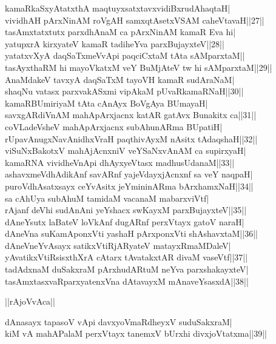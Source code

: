 \documentclass{article}
\begin{document}
kamaRkaSxyAtatxthA maqtuyxsatxtavxvidiBxrudAhaqtaH|\\
vividhAH pArxNinAM roVgAH samxqtAsetxVSAM caheVtavaH||27||\\
tasAmxtatxtutx parxdhAnaM ca pArxNinAM kamaR Eva hi|\\
yatupxrA kirxyateV kamaR tadiheYva parxBujayxteV||28||\\
yatatxvXyA daqSaTxmeVvApi paqciCxtaM tAta sAMparxtaM||\\
tasAyxthaRM hi mayoVkatxM veY BuMjAteV tw hi sAMparxtaM||29||\\
AnaMdakeV tavxyA daqSaTxM tayoVH kamaR sudAraNaM|\\
shaqNu vatasx parxvakASxmi vipAkaM pUvaRkamaRNaH||30||\\
kamaRBUmiriyaM tAta cAnAyx BoVgAya BUmayaH|\\
savxgARdiVnAM mahApArxjacnx katAR gatAvx Bunakitx ca||31||\\
coVLadeVsheV mahApArxjacnx subAhunARma BUpatiH|\\
rUpavAnugxNavAnidhxVraH paqthivAyxM nAsitx tAdaqshaH||32||\\
viSuNxBakotxV mahAjAcnxniV veYSaNxvAnAM ca supirxyaH|\\
kamaRNA vividheVnApi dhAyxyeVtasx madhusUdanaM||33||\\
ashavxmeVdhAdikAnf savARnf yajeVdayxjAcnxnf sa veY naqpaH|\\
puroVdhAsatxsayx ceYvAsitx jeYmininARma bArxhamxNaH||34||\\
sa cAhUya subAhuM tamidaM vacanaM mabarxviVtf|\\
rAjanf deVhi sudAnAni yeYshacx swKayxM parxBujayxteV||35||\\
dAneYsutx laBateV loVkAnf dugARnf perxVtayx gatoV naraH|\\
dAneVna suKamAponxVti yashaH pArxponxVti shAshavxtaM||36||\\
dAneVneYvAsayx satikxVtiRjARyateV matayxRmaMDaleV|\\
yAvatikxVtiRsisxthXrA cAtarx tAvatakxtAR divaM vaseVtf||37||\\
tadAdxnaM duSakxraM pArxhudARtuM neYva parxshakayxteV|\\
tasAmxtasxvaRparxyatenxVna dAtavayxM mAnaveYsasxdA||38||\\

\begin{center}
||rAjoVvAca||
\end{center}

dAnasayx tapasoV vApi davxyoVmaRdheyxV suduSakxraM|\\
kiM vA mahAPalaM perxVtayx tanemxV bUrxhi divxjoVtatxma||39||\\
\end{document}
